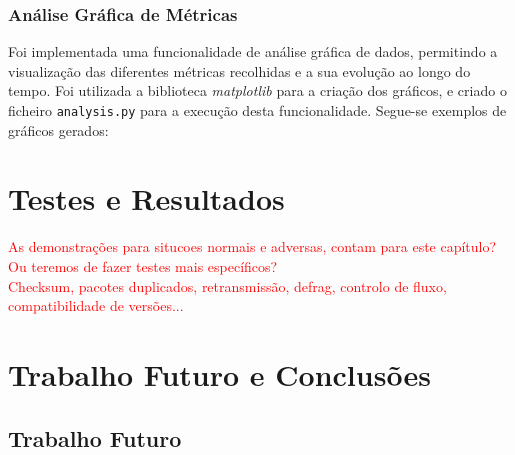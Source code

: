 \documentclass[a4paper,12pt]{scrreprt}
\begin{document}
\subsection{Análise Gráfica de Métricas}

Foi implementada uma funcionalidade de análise gráfica de dados, permitindo a visualização
das diferentes métricas recolhidas e a sua evolução ao longo do tempo. Foi utilizada a biblioteca
\textit{matplotlib} para a criação dos gráficos, e criado o ficheiro \texttt{analysis.py} para a execução
desta funcionalidade. Segue-se exemplos de gráficos gerados:



\chapter{Testes e Resultados}

\textcolor{red}{
    As demonstrações para situcoes normais e adversas, contam para este capítulo?
    Ou teremos de fazer testes mais específicos? \\
    Checksum, pacotes duplicados, retransmissão, defrag, controlo de fluxo, compatibilidade de versões...
}



\chapter{Trabalho Futuro e Conclusões}

\section{Trabalho Futuro}
\end{document}
